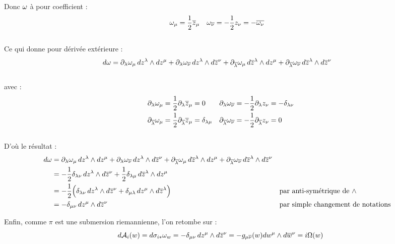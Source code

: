Donc $\omega$ à pour coefficient :
\begin{align} \label{eq:sym2conn}
	\omega_\mu &= \frac{1}{2} \overline{z}_\mu  &  \omega_{\overline{\nu}} &= - \frac{1}{2} z_\nu = -\overline{\omega_\nu}
\end{align}
\\
Ce qui donne pour dérivée extérieure :
\begin{align*}
	d\omega &= \partial_\lambda\omega_\mu\, dz^\lambda \wedge dz^\mu 
	+ \partial_\lambda\omega_{\overline{\nu}}\, dz^\lambda \wedge d\overline{z}^\nu
	+ \partial_{\overline{\lambda}}\omega_\mu\, d\overline{z}^\lambda \wedge dz^\mu 
	+ \partial_{\overline{\lambda}}\omega_{\overline{\nu}}\, d\overline{z}^\lambda \wedge d\overline{z}^\nu
\end{align*}
\\
avec :
\begin{align*}
	\partial_\lambda \omega_\mu &= \frac{1}{2}\partial_\lambda \overline{z}_\mu = 0   &
	\partial_\lambda\omega_{\overline{\nu}} &= -\frac{1}{2}\partial_\lambda z_\nu = -\delta_{\lambda \nu} \\
	\partial_{\overline{\lambda}}\omega_\mu &= \frac{1}{2}\partial_{\overline{\lambda}} \overline{z}_\mu = \delta_{\lambda \mu}  &
	\partial_{\overline{\lambda}} \omega_{\overline{\nu}} &= -\frac{1}{2}\partial_{\overline{\lambda}} z_\nu = 0
\end{align*}
\\
D'où le résultat :
\begin{align*}
	d\omega &= \partial_\lambda\omega_\mu\, dz^\lambda \wedge dz^\mu 
	+ \partial_\lambda\omega_{\overline{\nu}}\, dz^\lambda \wedge d\overline{z}^\nu
	+ \partial_{\overline{\lambda}}\omega_\mu\, d\overline{z}^\lambda \wedge dz^\mu 
	+ \partial_{\overline{\lambda}}\omega_{\overline{\nu}}\, d\overline{z}^\lambda \wedge d\overline{z}^\nu \\
	&= -\frac{1}{2}\delta_{\lambda \nu}\, dz^\lambda \wedge d\overline{z}^\nu
	+ \frac{1}{2}\delta_{\lambda \mu}\, d\overline{z}^\lambda \wedge dz^\mu \\
	&= -\frac{1}{2}\Big( \delta_{\lambda \nu}\, dz^\lambda \wedge d\overline{z}^\nu + \delta_{\mu \lambda}\, dz^\mu \wedge d\overline{z}^\lambda \Big)  &  &\text{par anti-symétrique de $\wedge$}\\
	&= -\delta_{\mu \nu}\, dz^\mu \wedge d\overline{z}^\nu  &  &\text{par simple changement de notations}
\end{align*}
\skipl

Enfin, comme $\pi$ est une submersion riemannienne, l'on retombe sur :
\[d\mathcal{A}_i(w) = d\sigma_{i*}\omega_w = -\delta_{\mu \nu}\, dz^\mu \wedge d\overline{z}^\nu = -g_{\mu \overline{\nu}}(w) dw^\mu \wedge d\overline{w}^\nu = i\Omega(w)\]
\skipl




